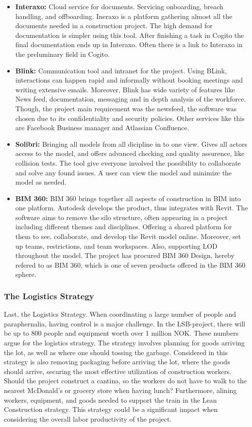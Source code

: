 \begin{itemize}
    \item {\bf Interaxo:} Cloud service for documents. Servicing onboarding, breach handling, and offboarding. Ineraxo is a platform gathering almost all the documents needed in a construction project. The high demand for documentation is simpler using this tool. After finishing a task in Cogito the final documentation ends up in Interaxo. Often there is a link to Interaxo in the preluminary field in Cogito.
    \item {\bf Blink:} Communication tool and intranet for the project. Using BLink, interactions can happen rapid and informally without booking meetings and writing extensive emails. Moreover, Blink has wide variety of features like News feed, documentation, messaging and in depth analysis of the workforce. Though, the project main requirement was the newsfeed, the software was chosen due to its confidentiality and security policies. Other services like this are Facebook Business manager and Atlassian Confluence. 
    \item { \bf Solibri:} Bringing all models from all dicipline in to one view. Gives all actors access to the model, and offers advanced checking and quality assurence, like collision tests. The tool give everyone involved the possibility to collaborate and solve any found issues. A user can view the model and minimize the model as needed. 
    \item { \bf BIM 360:} BIM 360 brings together all aspects of construction in BIM into one platform. Autodesk develops the product, thus integrates with Revit. The software aims to remove the silo structure, often appearing in a project including different themes and disciplines. Offering a shared platform for them to see, collaborate, and develop the Revit model online. Moreover, set up teams, restrictions, and team workspaces. Also, supporting LOD throughout the model. The project has procured BIM 360 Design, hereby refered to as BIM 360, which is one of seven products offered in the BIM 360 sphere.
   \end{itemize}

\subsubsection*{The Logistics Strategy}
Last, the Logistics Strategy. When coordinating a large number of people and paraphernalia, having control is a major challenge. In the LSB-project, there will be up to 800 people and equipment worth over 1 million NOK.  These numbers argue for the logistics strategy. The strategy involves planning for goods arriving the lot, as well as where one should tossing the garbage. Considered in this strategy is also removing packaging before arriving the lot, where the goods should arrive, securing the most effective utilization of construction workers. Should the project construct a cantina, so the workers do not have to walk to the nearest McDonald's or grocery store when having lunch? Furthermore, alining workers, equipment, and goods needed to support the train in the Lean Construction strategy. This strategy could be a significant impact when considering the overall labor productivity of the project. 


